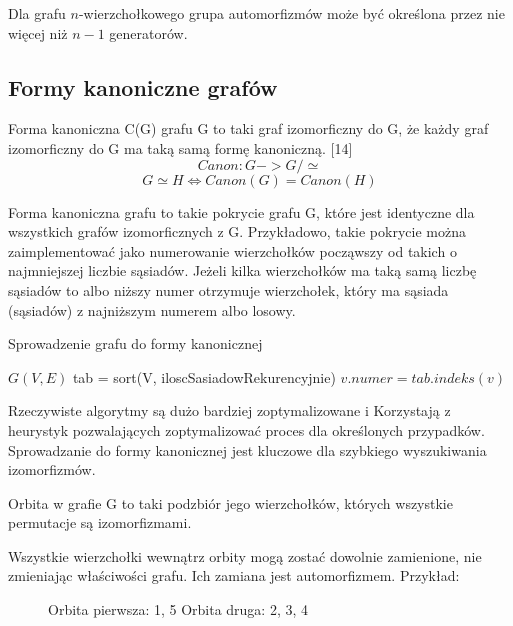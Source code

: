   \begin{theorem}
    Dla grafu $n$-wierzchołkowego grupa automorfizmów może być określona przez nie więcej niż 
    $n-1$ generatorów. 
  \end{theorem}

  \subsection{Formy kanoniczne grafów}

  \begin{definition}
    Forma kanoniczna C(G) grafu G to taki graf izomorficzny do G, że każdy graf izomorficzny do G ma taką samą formę kanoniczną. 
    [14]$$ Canon \colon G -> G/ \simeq $$
    $$G \simeq H \iff Canon(G) = Canon(H) $$
  \end{definition}

  Forma kanoniczna grafu to takie pokrycie grafu G, 
  które jest identyczne dla wszystkich grafów izomorficznych z G. Przykładowo, takie pokrycie można zaimplementować
   jako numerowanie wierzchołków począwszy od takich o najmniejszej liczbie sąsiadów. 
   Jeżeli kilka wierzchołków ma taką samą liczbę sąsiadów to albo niższy numer otrzymuje wierzchołek, 
   który ma sąsiada (sąsiadów) z najniższym numerem albo losowy. 


   \begin{algorithm}
    \caption{Sprowadzenie grafu do formy kanonicznej}
    \begin{algorithmic}
    \REQUIRE $G(V, E) $
    \STATE tab = sort(V, iloscSasiadowRekurencyjnie)
      \STATE $v.numer = tab.indeks(v) $
    \ENDFOR
    \end{algorithmic}
  \end{algorithm}
  
  Rzeczywiste algorytmy są dużo bardziej zoptymalizowane i Korzystają z 
  heurystyk pozwalających zoptymalizować proces dla określonych przypadków.
  Sprowadzanie do formy kanonicznej jest kluczowe dla szybkiego wyszukiwania izomorfizmów. 

\begin{definition}[Orbita]
  Orbita w grafie G to taki podzbiór jego wierzchołków, których wszystkie permutacje są izomorfizmami. 
\end{definition}

Wszystkie wierzchołki wewnątrz orbity mogą zostać dowolnie zamienione, nie zmieniając właściwości grafu. Ich zamiana jest automorfizmem.
Przykład: 
\begin{figure}[H]
  \centering
    \caption{Orbita pierwsza: 1, 5 
    Orbita druga: 2, 3, 4}
 \end{figure}



